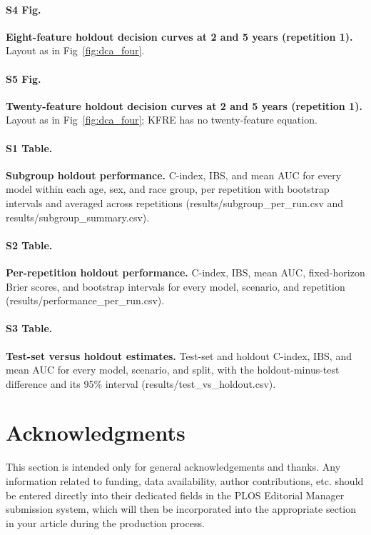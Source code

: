 \documentclass[10pt,letterpaper]{article}
\begin{document}
\paragraph*{S4 Fig.}
\label{S4_Fig}
\textbf{Eight-feature holdout decision curves at 2 and 5 years (repetition 1).} Layout as in Fig~\ref{fig:dca_four}.

\paragraph*{S5 Fig.}
\label{S5_Fig}
\textbf{Twenty-feature holdout decision curves at 2 and 5 years (repetition 1).} Layout as in Fig~\ref{fig:dca_four}; KFRE has no twenty-feature equation.

\paragraph*{S1 Table.}
\label{S1_Table}
\textbf{Subgroup holdout performance.} C-index, IBS, and mean AUC for every model within each age, sex, and race group, per repetition with bootstrap intervals and averaged across repetitions (results/subgroup\_per\_run.csv and results/subgroup\_summary.csv).

\paragraph*{S2 Table.}
\label{S2_Table}
\textbf{Per-repetition holdout performance.} C-index, IBS, mean AUC, fixed-horizon Brier scores, and bootstrap intervals for every model, scenario, and repetition (results/performance\_per\_run.csv).

\paragraph*{S3 Table.}
\label{S3_Table}
\textbf{Test-set versus holdout estimates.} Test-set and holdout C-index, IBS, and mean AUC for every model, scenario, and split, with the holdout-minus-test difference and its 95\% interval (results/test\_vs\_holdout.csv).

\section*{Acknowledgments}

This section is intended only for general acknowledgements and thanks. Any
information related to funding, data availability, author contributions, etc.
should be entered directly into their dedicated fields in the PLOS Editorial
Manager submission system, which will then be incorporated into the appropriate
section in your article during the production process.

\nolinenumbers


\end{document}
